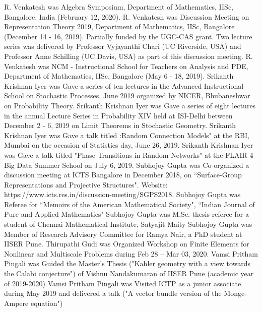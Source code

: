 \begin{enumerate}
R. Venkatesh was Algebra Symposium, Department of Mathematics, IISc, Bangalore, India (February 12, 2020).
R. Venkatesh was Discussion Meeting on Representation Theory 2019, Department of Mathematics, IISc, Bangalore (December 14 - 16, 2019). Partially funded by the UGC-CAS grant.  Two lecture series was delivered by Professor Vyjayanthi Chari (UC Riverside, USA) and Professor Anne Schilling (UC Davis, USA) as part of this discussion meeting.
R. Venkatesh was NCM - Instructional School for Teachers on Analysis and PDE, Department of Mathematics, IISc, Bangalore (May 6 - 18, 2019). 
Srikanth Krishnan Iyer was Gave a series of ten lectures in the Advanced Instructional School on Stochastic Processes, June 2019 organized by NICER, Bhubaneshwar on Probability Theory.
Srikanth Krishnan Iyer was Gave a series of eight lectures in the annual Lecture Series in Probability XIV held at ISI-Delhi between December 2 - 6, 2019 on Limit Theorems in Stochastic Geometry.
Srikanth Krishnan Iyer was Gave a talk titled :Random Connection Models" at the RBI, Mumbai on the occasion of Statistics day, June 26, 2019.
Srikanth Krishnan Iyer was Gave a talk titled "Phase Transitions in Random Networks" at the FLAIR 4 Big Data Summer School on July 6, 2019.
Subhojoy Gupta was Co-organized a discussion meeting at ICTS Bangalore in December 2018, on “Surface-Group Representations and Projective Structures". Website: https://www.icts.res.in/discussion-meeting/SGPS2018.
Subhojoy Gupta was Referee for “Memoirs of the American Mathematical Society",  “Indian Journal of Pure and Applied Mathematics"
Subhojoy Gupta was M.Sc. thesis referee for a student of Chennai Mathematical Institute,  Satyajit Maity
Subhojoy Gupta was Member of Research Advisory Committee for Ramya Nair, a PhD student at IISER Pune. 
Thirupathi Gudi was Organized Workshop on Finite Elements for Nonlinear and Multiscale Problems during Feb 28 – Mar 03, 2020.
Vamsi Pritham Pingali was Guided the Master's Thesis ("Kahler geometry with a view towards the Calabi conjecture") of Vishnu Nandakumaran of IISER Pune (academic year of 2019-2020)
Vamsi Pritham Pingali was Visited ICTP as a junior associate during May 2019 and delivered a talk ("A vector bundle version of the Monge-Ampere equation")
\end{enumerate}

